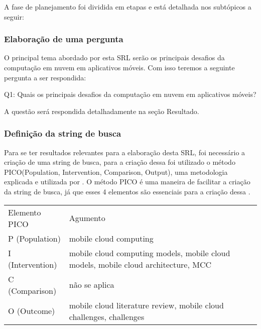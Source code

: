 \documentclass[12pt]{article}
\begin{document}
A fase de planejamento foi dividida em etapas e está detalhada nos subtópicos a seguir:

\subsubsection{Elaboração de uma pergunta}
O principal tema abordado por esta SRL serão os principais desafios da computação em nuvem em aplicativos móveis. Com isso teremos a seguinte pergunta a ser respondida:

Q1: Quais os principais desafios da computação em nuvem em aplicativos móveis?

A questão será respondida detalhadamente na seção Resultado.

 
\subsubsection{Definição da string de busca}

Para se ter resultados relevantes para a elaboração desta SRL, foi necessário a criação de uma string de busca, para a criação dessa foi utilizado o método PICO(Population, Intervention, Comparison, Output), uma metodologia explicada e utilizada por \cite{SANTOS2007}. O método PICO é uma maneira de facilitar a criação da string de busca, já que esses 4 elementos são essenciais para a criação dessa \cite{SANTOS2007}.

\begin{table}[h]
 \centering
 {\renewcommand\arraystretch{1.25}
 \begin{tabular}{ l l }
  \cline{1-1}\cline{2-2}  
    \multicolumn{1}{|p{5cm}|}{Elemento PICO} &
    \multicolumn{1}{p{8cm}|}{Agumento}
  \\  
  \cline{1-1}\cline{2-2}  
    \multicolumn{1}{|p{5cm}|}{P (Population)} &
    \multicolumn{1}{p{8cm}|}{mobile cloud computing}
  \\  
  \cline{1-1}\cline{2-2}  
    \multicolumn{1}{|p{5cm}|}{I (Intervention)} &
    \multicolumn{1}{p{8cm}|}{mobile cloud computing models, mobile cloud models, mobile cloud architecture, MCC}
  \\  
  \cline{1-1}\cline{2-2}  
    \multicolumn{1}{|p{5cm}|}{C (Comparison)} &
    \multicolumn{1}{p{8cm}|}{não se aplica}
  \\  
  \cline{1-1}\cline{2-2}  
    \multicolumn{1}{|p{5cm}|}{O (Outcome)} &
    \multicolumn{1}{p{8cm}|}{mobile cloud literature review, mobile cloud challenges, challenges}
  \\  
  \hline
 \end{tabular} }
\end{table}
\end{document}
